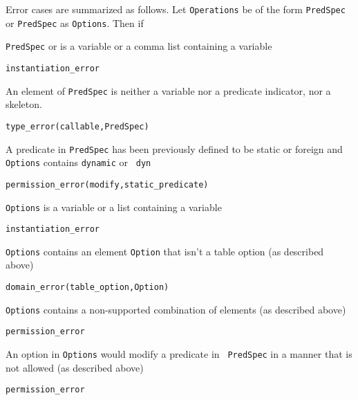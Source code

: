 \begin{description}
Error cases are summarized as follows.  Let {\tt Operations} be of the
form {\tt PredSpec} or {\tt PredSpec} as {\tt Options}.  Then if 
%
\bi
\item {\tt PredSpec} or is a variable or a comma list containing a variable
\bi
\item {\tt instantiation\_error}
\ei
\item An element of {\tt PredSpec} is neither a variable nor a
  predicate indicator, nor a skeleton.
\bi
\item 	{\tt type\_error(callable,PredSpec)}
\ei
\item A predicate in {\tt PredSpec} has been previously defined to be
  static or foreign and {\tt Options} contains {\tt dynamic} or {\tt
    dyn}
\bi
\item 	{\tt permission\_error(modify,static\_predicate)}
\ei
\item {\tt Options} is a variable or a list containing a variable
\bi
\item {\tt instantiation\_error}
\ei
\item {\tt Options} contains an element {\tt Option} that isn't a table option (as described above)
\bi
\item {\tt domain\_error(table\_option,Option)}
\ei
\item {\tt Options} contains a non-supported combination of  elements (as described above)
\bi
\item {\tt permission\_error}
\ei
\item An option in {\tt Options} would modify a predicate in {\tt
  PredSpec} in a manner that is not allowed (as described above) 
\bi
\item {\tt permission\_error}
\ei
\ei


%
%


%

\end{description}

